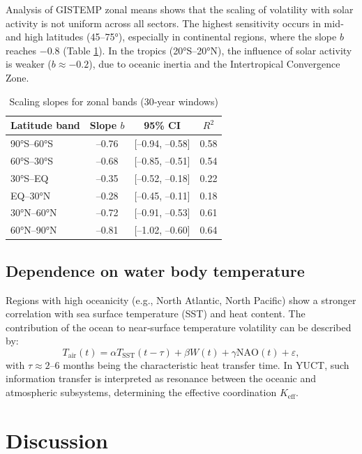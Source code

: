 \documentclass[12pt,a4paper]{article}
\newcommand{\Keff}{K_{\mathrm{eff}}}
\begin{document}
	Analysis of GISTEMP zonal means shows that the scaling of volatility with solar activity is not uniform across all sectors. The highest sensitivity occurs in mid‑ and high latitudes (45–75°), especially in continental regions, where the slope \(b\) reaches \(-0.8\) (Table \ref{tab:zonal}). In the tropics (20°S–20°N), the influence of solar activity is weaker (\(b \approx -0.2\)), due to oceanic inertia and the Intertropical Convergence Zone.
	
	\begin{table}[htbp]
		\centering
		\caption{Scaling slopes for zonal bands (30‑year windows)}
		\label{tab:zonal}
		\begin{tabular}{@{}lccc@{}}
			\toprule
			Latitude band & Slope \(b\) & 95\% CI & \(R^2\) \\
			\midrule
			90°S–60°S & –0.76 & [–0.94, –0.58] & 0.58 \\
			60°S–30°S & –0.68 & [–0.85, –0.51] & 0.54 \\
			30°S–EQ & –0.35 & [–0.52, –0.18] & 0.22 \\
			EQ–30°N & –0.28 & [–0.45, –0.11] & 0.18 \\
			30°N–60°N & –0.72 & [–0.91, –0.53] & 0.61 \\
			60°N–90°N & –0.81 & [–1.02, –0.60] & 0.64 \\
			\bottomrule
		\end{tabular}
	\end{table}
	
	\subsection{Dependence on water body temperature}
	
	Regions with high oceanicity (e.g., North Atlantic, North Pacific) show a stronger correlation with sea surface temperature (SST) and heat content. The contribution of the ocean to near‑surface temperature volatility can be described by:
	\[
	T_{\text{air}}(t) = \alpha T_{\text{SST}}(t-\tau) + \beta W(t) + \gamma \text{NAO}(t) + \varepsilon,
	\]
	with \(\tau \approx 2\)–6 months being the characteristic heat transfer time. In YUCT, such information transfer is interpreted as resonance between the oceanic and atmospheric subsystems, determining the effective coordination \(\Keff\).
	
	\section{Discussion}
	
\end{document}
